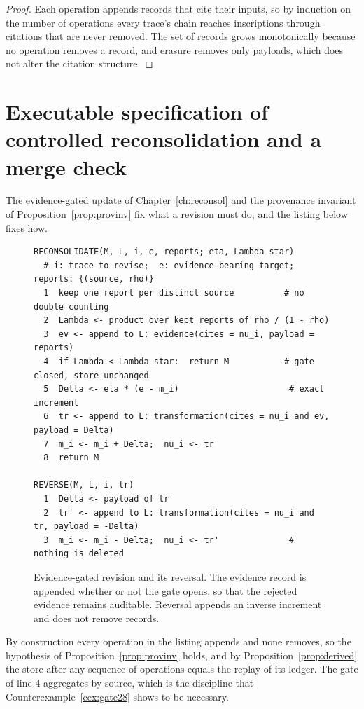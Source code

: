 \begin{proof}
Each operation appends records that cite their inputs, so by induction on the number of operations every trace's chain reaches inscriptions through citations that are never removed. The set of records grows monotonically because no operation removes a record, and erasure removes only payloads, which does not alter the citation structure.
\end{proof}

\section*{Executable specification of controlled reconsolidation and a merge check}\label{sec:reconcode}

The evidence-gated update of Chapter~\ref{ch:reconsol} and the provenance invariant of Proposition~\ref{prop:provinv} fix what a revision must do, and the listing below fixes how.

\begin{figure}[t]
\centering
\begin{Verbatim}[fontsize=\footnotesize,frame=single,framesep=2mm]
RECONSOLIDATE(M, L, i, e, reports; eta, Lambda_star)
  # i: trace to revise;  e: evidence-bearing target;  reports: {(source, rho)}
  1  keep one report per distinct source          # no double counting
  2  Lambda <- product over kept reports of rho / (1 - rho)
  3  ev <- append to L: evidence(cites = nu_i, payload = reports)
  4  if Lambda < Lambda_star:  return M           # gate closed, store unchanged
  5  Delta <- eta * (e - m_i)                      # exact increment
  6  tr <- append to L: transformation(cites = nu_i and ev, payload = Delta)
  7  m_i <- m_i + Delta;  nu_i <- tr
  8  return M

REVERSE(M, L, i, tr)
  1  Delta <- payload of tr
  2  tr' <- append to L: transformation(cites = nu_i and tr, payload = -Delta)
  3  m_i <- m_i - Delta;  nu_i <- tr'              # nothing is deleted
\end{Verbatim}
\caption{Evidence-gated revision and its reversal. The evidence record is appended whether or not the gate opens, so that the rejected evidence remains auditable. Reversal appends an inverse increment and does not remove records.}\label{fig:reconcode}
\end{figure}

By construction every operation in the listing appends and none removes, so the hypothesis of Proposition~\ref{prop:provinv} holds, and by Proposition~\ref{prop:derived} the store after any sequence of operations equals the replay of its ledger. The gate of line 4 aggregates by source, which is the discipline that Counterexample~\ref{cex:gate28} shows to be necessary.

